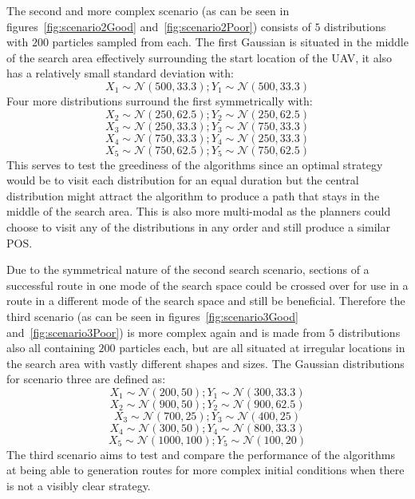 \documentclass[10pt,a4paper, oneside, conference]{IEEEtran}
\begin{document}
	 The second and more complex scenario (as can be seen in figures~\ref{fig:scenario2Good} and~\ref{fig:scenario2Poor}) consists of $5$ distributions with $200$ particles sampled from each.
	 The first Gaussian is situated in the middle of the search area effectively surrounding the start location of the UAV, it also has a relatively small standard deviation with:
	  $$X_1\sim\mathcal{N}(500,33.3); Y_1\sim \mathcal{N}(500,33.3)$$
	 Four more distributions surround the first symmetrically with: 
	 $$X_2\sim \mathcal{N}(250,62.5);Y_2\sim \mathcal{N}(250,62.5)$$
	 $$X_3\sim \mathcal{N}(250,33.3);Y_3\sim \mathcal{N}(750,33.3)$$
	 $$X_4\sim \mathcal{N}(750,33.3);Y_4\sim \mathcal{N}(250,33.3)$$
	 $$X_5\sim \mathcal{N}(750,62.5);Y_5\sim \mathcal{N}(750,62.5)$$
	 This serves to test the greediness of the algorithms since an optimal strategy would be to visit each distribution for an equal duration but the central distribution might attract the algorithm to produce a path that stays in the middle of the search area.
	 This is also more multi-modal as the planners could choose to visit any of the distributions in any order and still produce a similar POS.
	 
	 Due to the symmetrical nature of the second search scenario, sections of a successful route in one mode of the search space could be crossed over for use in a route in a different mode of the search space and still be beneficial.
	 Therefore the third scenario (as can be seen in figures~\ref{fig:scenario3Good} and~\ref{fig:scenario3Poor}) is more complex again and is made from $5$ distributions also all containing $200$ particles each, but are all situated at irregular locations in the search area with vastly different shapes and sizes. The Gaussian distributions for scenario three are defined as:
	 $$X_1\sim\mathcal{N}(200,50); Y_1\sim \mathcal{N}(300,33.3)$$
	 $$X_2\sim \mathcal{N}(900,50);Y_2\sim \mathcal{N}(900,62.5)$$
	 $$X_3\sim \mathcal{N}(700,25);Y_3\sim \mathcal{N}(400,25)$$
	 $$X_4\sim \mathcal{N}(300,50);Y_4\sim \mathcal{N}(800,33.3)$$
	 $$X_5\sim \mathcal{N}(1000,100);Y_5\sim \mathcal{N}(100,20)$$
	 The third scenario aims to test and compare the performance of the algorithms at being able to generation routes for more complex initial conditions when there is not a visibly clear strategy.
	
\end{document}
